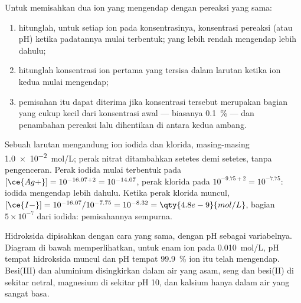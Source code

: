 \begin{method}\label{met:b1:precipitation:selective}
Untuk memisahkan dua ion yang mengendap dengan pereaksi yang sama:
\begin{enumerate}
  \item hitunglah, untuk setiap ion pada konsentrasinya, konsentrasi
        pereaksi (atau pH) ketika padatannya mulai terbentuk; yang lebih
        rendah mengendap lebih dahulu;
  \item hitunglah konsentrasi ion pertama yang tersisa dalam larutan
        ketika ion kedua mulai mengendap;
  \item pemisahan itu dapat diterima jika konsentrasi tersebut merupakan
        bagian yang cukup kecil dari konsentrasi awal --- biasanya
        \qty{0.1}{\percent} --- dan penambahan pereaksi lalu dihentikan di
        antara kedua ambang.
\end{enumerate}
\end{method}

\begin{example}\label{ex:b1:precipitation:i-cl}
Sebuah larutan mengandung ion iodida dan klorida, masing-masing
\qty{1.0e-2}{mol/L}; perak nitrat ditambahkan setetes demi setetes, tanpa
pengenceran. Perak iodida mulai terbentuk pada $[\ce{Ag+}] = 10^{-16.07 + 2} =
10^{-14.07}$, perak klorida pada $10^{-9.75 + 2} = 10^{-7.75}$: iodida
mengendap lebih dahulu. Ketika perak klorida muncul,
$[\ce{I-}] = 10^{-16.07}/10^{-7.75} = 10^{-8.32} = \qty{4.8e-9}{mol/L}$,
bagian $5 \times 10^{-7}$ dari iodida: pemisahannya sempurna.
\end{example}

Hidroksida dipisahkan dengan cara yang sama, dengan pH sebagai
variabelnya. Diagram di bawah memperlihatkan, untuk enam ion pada
\qty{0.010}{mol/L}, pH tempat hidroksida muncul dan pH tempat
\qty{99.9}{\percent} ion itu telah mengendap. Besi(III) dan aluminium
disingkirkan dalam air yang asam, seng dan besi(II) di sekitar netral,
magnesium di sekitar pH 10, dan kalsium hanya dalam air yang sangat basa.

